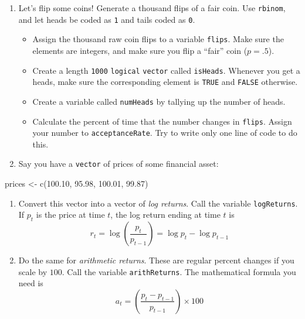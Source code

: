 \documentclass[
  12pt,
  krantz2]{krantz}
\makeatletter
\newenvironment{Shaded}{\begin{snugshade}}{\end{snugshade}}
\newcommand{\FloatTok}[1]{\textcolor[rgb]{0.06,0.06,0.06}{#1}}
\newcommand{\FunctionTok}[1]{\textcolor[rgb]{0,0,0}{#1}}
\newcommand{\NormalTok}[1]{#1}
\newcommand{\OtherTok}[1]{\textcolor[rgb]{0.37,0.37,0.37}{#1}}
\providecommand{\tightlist}{%
  \setlength{\itemsep}{0pt}\setlength{\parskip}{0pt}}
\newenvironment{kframe}{%
\medskip{}
\setlength{\fboxsep}{.8em}
 \def\at@end@of@kframe{}%
 \ifinner\ifhmode%
  \def\at@end@of@kframe{\end{minipage}}%
  \begin{minipage}{\columnwidth}%
 \fi\fi%
 \def\FrameCommand##1{\hskip\@totalleftmargin \hskip-\fboxsep
 \colorbox{shadecolor}{##1}\hskip-\fboxsep
     \hskip-\linewidth \hskip-\@totalleftmargin \hskip\columnwidth}%
 \MakeFramed {\advance\hsize-\width
   \@totalleftmargin\z@ \linewidth\hsize
   \@setminipage}}%
 {\par\unskip\endMakeFramed%
 \at@end@of@kframe}
\renewenvironment{Shaded}{\begin{kframe}}{\end{kframe}}
\makeatother
\begin{document}
\begin{enumerate}
\def\labelenumi{\arabic{enumi}.}
\item
  Let's flip some coins! Generate a thousand flips of a fair coin. Use \texttt{rbinom}, and let heads be coded as \texttt{1} and tails coded as \texttt{0}.

  \begin{itemize}
  \tightlist
  \item
    Assign the thousand raw coin flips to a variable \texttt{flips}. Make sure the elements are integers, and make sure you flip a ``fair'' coin (\(p=.5\)).
  \item
    Create a length \texttt{1000} \texttt{logical} \texttt{vector} called \texttt{isHeads}. Whenever you get a heads, make sure the corresponding element is \texttt{TRUE} and \texttt{FALSE} otherwise.
  \item
    Create a variable called \texttt{numHeads} by tallying up the number of heads.
  \item
    Calculate the percent of time that the number changes in \texttt{flips}. Assign your number to \texttt{acceptanceRate}. Try to write only one line of code to do this.
  \end{itemize}
\item
  Say you have a \texttt{vector} of prices of some financial asset:
\end{enumerate}

\begin{Shaded}
\begin{Highlighting}[]
\NormalTok{prices }\OtherTok{\textless{}{-}} \FunctionTok{c}\NormalTok{(}\FloatTok{100.10}\NormalTok{, }\FloatTok{95.98}\NormalTok{, }\FloatTok{100.01}\NormalTok{, }\FloatTok{99.87}\NormalTok{)}
\end{Highlighting}
\end{Shaded}

\begin{enumerate}
\def\labelenumi{\alph{enumi}.}
\item
  Convert this vector into a vector of \emph{log returns}. Call the variable \texttt{logReturns}. If \(p_t\) is the price at time \(t\), the log return ending at time \(t\) is
  \[ r_t = \log \left( \frac{p_t}{p_{t-1}} \right) = \log p_t - \log p_{t-1}\]
\item
  Do the same for \emph{arithmetic returns}. These are regular percent changes if you scale by \(100\). Call the variable \texttt{arithReturns}. The mathematical formula you need is \[ a_t = \left( \frac{p_t - p_{t-1} }{p_{t-1}} \right) \times 100 \]
\end{enumerate}
\end{document}
